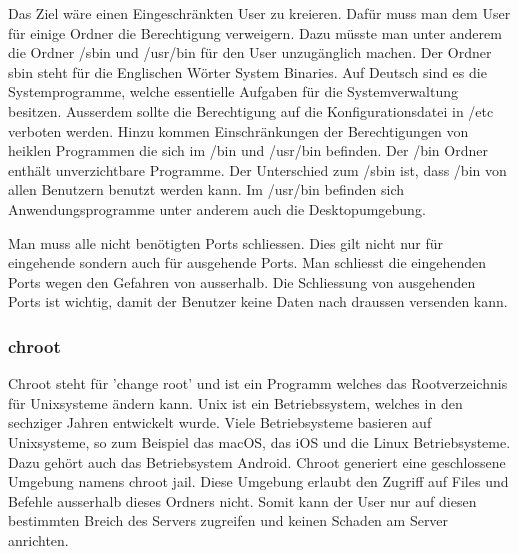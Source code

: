 \documentclass[10pt]{article}
\begin{document}
	Das Ziel wäre einen Eingeschränkten User zu kreieren. Dafür muss man dem User für einige Ordner die Berechtigung verweigern. Dazu müsste man unter anderem die Ordner /sbin und /usr/bin für den User unzugänglich machen. Der Ordner sbin steht für die Englischen Wörter System Binaries. Auf Deutsch sind es die Systemprogramme, welche essentielle Aufgaben für die Systemverwaltung besitzen. Ausserdem sollte die Berechtigung auf die Konfigurationsdatei in /etc verboten werden. Hinzu kommen Einschränkungen der Berechtigungen von heiklen Programmen die sich im /bin und /usr/bin befinden.  Der /bin Ordner enthält unverzichtbare Programme. Der Unterschied zum /sbin ist, dass /bin von allen Benutzern benutzt werden kann. Im /usr/bin befinden sich Anwendungsprogramme unter anderem auch die Desktopumgebung.\cite{verzeichnis}
	
	Man muss alle nicht benötigten Ports schliessen. Dies gilt nicht nur für eingehende sondern auch für ausgehende Ports. Man schliesst die eingehenden Ports  wegen den Gefahren von ausserhalb. Die Schliessung von ausgehenden Ports ist wichtig, damit der Benutzer keine Daten nach draussen versenden kann. 
	
	\subsubsection{chroot}
	
	Chroot steht für 'change root'  und ist ein Programm welches das Rootverzeichnis für Unixsysteme ändern kann.\cite{chroot} Unix ist ein Betriebssystem, welches in den sechziger Jahren entwickelt wurde. Viele Betriebsysteme basieren auf Unixsysteme, so zum Beispiel das macOS, das iOS und die Linux Betriebsysteme. Dazu gehört auch das Betriebsystem Android.\cite{unix} Chroot generiert eine geschlossene Umgebung namens chroot jail. Diese Umgebung erlaubt den Zugriff auf  Files und Befehle ausserhalb dieses Ordners nicht. Somit kann der User nur auf diesen bestimmten Breich des Servers zugreifen und keinen Schaden am Server anrichten.\cite{archChroot}	
	
\pagebreak	
	
\end{document}
